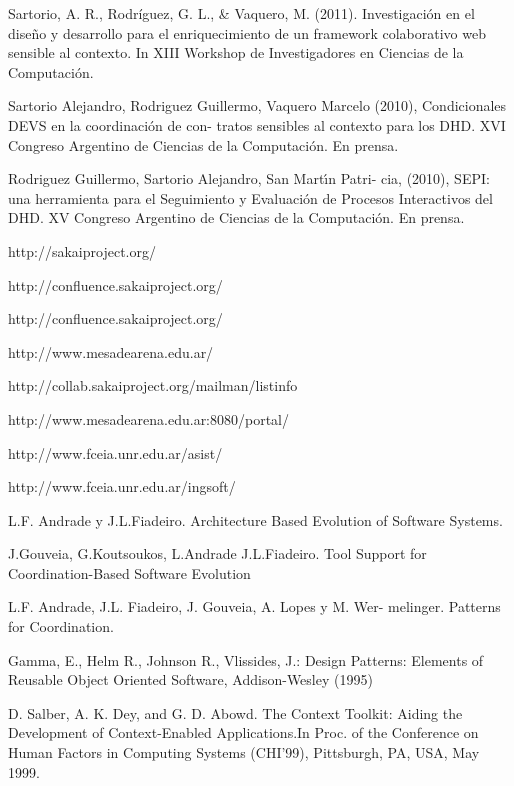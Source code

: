 \begin{thebibliography}{1}
{
Sartorio, A. R., Rodríguez, G. L., & Vaquero, M. (2011). Investigación en el diseño y desarrollo para el enriquecimiento de un framework colaborativo web sensible al contexto. In XIII Workshop de Investigadores en Ciencias de la Computación.



Sartorio Alejandro, Rodriguez Guillermo, Vaquero Marcelo
(2010), Condicionales DEVS en la coordinación de con-
tratos sensibles al contexto para los DHD. XVI Congreso
Argentino de Ciencias de la Computación. En prensa.

Rodriguez Guillermo, Sartorio Alejandro, San Martı́n Patri-
cia, (2010), SEPI: una herramienta para el Seguimiento y
Evaluación de Procesos Interactivos del DHD. XV Congreso
Argentino de Ciencias de la Computación. En prensa.

http://sakaiproject.org/

http://confluence.sakaiproject.org/


http://confluence.sakaiproject.org/

http://www.mesadearena.edu.ar/

http://collab.sakaiproject.org/mailman/listinfo

http://www.mesadearena.edu.ar:8080/portal/

http://www.fceia.unr.edu.ar/asist/

http://www.fceia.unr.edu.ar/ingsoft/

L.F. Andrade y J.L.Fiadeiro. Architecture Based Evolution
of Software Systems.

J.Gouveia, G.Koutsoukos, L.Andrade J.L.Fiadeiro. Tool
Support for Coordination-Based Software Evolution

L.F. Andrade, J.L. Fiadeiro, J. Gouveia, A. Lopes y M. Wer-
melinger. Patterns for Coordination.

Gamma, E., Helm R., Johnson R., Vlissides, J.: Design
Patterns: Elements of Reusable Object Oriented Software,
Addison-Wesley (1995)

D. Salber, A. K. Dey, and G. D. Abowd. The Context Toolkit:
Aiding the Development of Context-Enabled Applications.In
Proc. of the Conference on Human Factors in Computing
Systems (CHI’99), Pittsburgh, PA, USA, May 1999.

}
\end{thebibliography}

